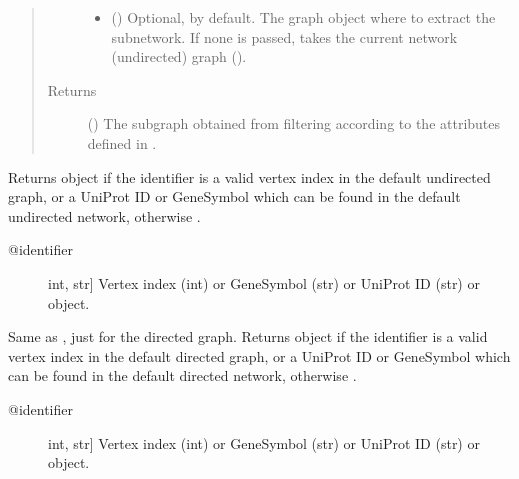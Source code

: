 \documentclass[letterpaper,10pt,english]{sphinxmanual}
\begin{document}
\begin{fulllineitems}
\begin{fulllineitems}
\begin{quote}
\begin{description}
\begin{itemize}
\item {} 
 () \textendash{} Optional,  by default. The graph object where to
extract the subnetwork. If none is passed, takes the current
network (undirected) graph
().

\end{itemize}

\item[{Returns}] \leavevmode
() \textendash{} The subgraph obtained from filtering
according to the attributes defined in .

\end{description}\end{quote}

\end{fulllineitems}


\begin{fulllineitems}
\label{\detokenize{main:pypath.main.PyPath.get_node}}
Returns  object if the identifier
is a valid vertex index in the default undirected graph,
or a UniProt ID or GeneSymbol which can be found in the
default undirected network, otherwise .
\begin{description}
\item[{@identifier}] \leavevmode{[}int, str{]}
Vertex index (int) or GeneSymbol (str) or UniProt ID (str) or
 object.

\end{description}

\end{fulllineitems}


\begin{fulllineitems}
\label{\detokenize{main:pypath.main.PyPath.get_node_d}}
Same as , just for the directed graph.
Returns  object if the identifier
is a valid vertex index in the default directed graph,
or a UniProt ID or GeneSymbol which can be found in the
default directed network, otherwise .
\begin{description}
\item[{@identifier}] \leavevmode{[}int, str{]}
Vertex index (int) or GeneSymbol (str) or UniProt ID (str) or
 object.


\end{description}
\end{fulllineitems}
\end{fulllineitems}
\end{document}
